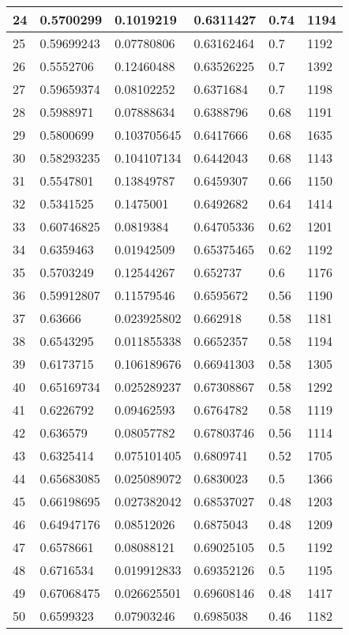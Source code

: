 \begin{longtable}{|l|l|l|l|l|l|}
24 & 0.5700299 & 0.1019219 & 0.6311427 & 0.74 & 1194 \\ \hline 
25 & 0.59699243 & 0.07780806 & 0.63162464 & 0.7 & 1192 \\ \hline 
26 & 0.5552706 & 0.12460488 & 0.63526225 & 0.7 & 1392 \\ \hline 
27 & 0.59659374 & 0.08102252 & 0.6371684 & 0.7 & 1198 \\ \hline 
28 & 0.5988971 & 0.07888634 & 0.6388796 & 0.68 & 1191 \\ \hline 
29 & 0.5800699 & 0.103705645 & 0.6417666 & 0.68 & 1635 \\ \hline 
30 & 0.58293235 & 0.104107134 & 0.6442043 & 0.68 & 1143 \\ \hline 
31 & 0.5547801 & 0.13849787 & 0.6459307 & 0.66 & 1150 \\ \hline 
32 & 0.5341525 & 0.1475001 & 0.6492682 & 0.64 & 1414 \\ \hline 
33 & 0.60746825 & 0.0819384 & 0.64705336 & 0.62 & 1201 \\ \hline 
34 & 0.6359463 & 0.01942509 & 0.65375465 & 0.62 & 1192 \\ \hline 
35 & 0.5703249 & 0.12544267 & 0.652737 & 0.6 & 1176 \\ \hline 
36 & 0.59912807 & 0.11579546 & 0.6595672 & 0.56 & 1190 \\ \hline 
37 & 0.63666 & 0.023925802 & 0.662918 & 0.58 & 1181 \\ \hline 
38 & 0.6543295 & 0.011855338 & 0.6652357 & 0.58 & 1194 \\ \hline 
39 & 0.6173715 & 0.106189676 & 0.66941303 & 0.58 & 1305 \\ \hline 
40 & 0.65169734 & 0.025289237 & 0.67308867 & 0.58 & 1292 \\ \hline 
41 & 0.6226792 & 0.09462593 & 0.6764782 & 0.58 & 1119 \\ \hline 
42 & 0.636579 & 0.08057782 & 0.67803746 & 0.56 & 1114 \\ \hline 
43 & 0.6325414 & 0.075101405 & 0.6809741 & 0.52 & 1705 \\ \hline 
44 & 0.65683085 & 0.025089072 & 0.6830023 & 0.5 & 1366 \\ \hline 
45 & 0.66198695 & 0.027382042 & 0.68537027 & 0.48 & 1203 \\ \hline 
46 & 0.64947176 & 0.08512026 & 0.6875043 & 0.48 & 1209 \\ \hline 
47 & 0.6578661 & 0.08088121 & 0.69025105 & 0.5 & 1192 \\ \hline 
48 & 0.6716534 & 0.019912833 & 0.69352126 & 0.5 & 1195 \\ \hline 
49 & 0.67068475 & 0.026625501 & 0.69608146 & 0.48 & 1417 \\ \hline 
50 & 0.6599323 & 0.07903246 & 0.6985038 & 0.46 & 1182 \\ \hline 
\end{longtable}